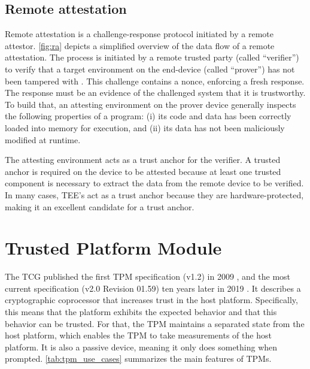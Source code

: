 \subsection{Remote attestation}



Remote attestation is a challenge-response protocol initiated by a remote attestor. \autoref{fig:ra} depicts a simplified overview of the data flow of a remote attestation.
The process is initiated by a remote trusted party (called ``verifier'') to verify that a target environment on the end-device (called ``prover'') has not been tampered with \cite{Menetrey2022, Coker2011}. This challenge contains a nonce, enforcing a fresh response.
The response must be an evidence of the challenged system that it is trustworthy. To build that, an attesting environment on the prover device generally inspects the following properties of a program: (i) its code and data has been correctly loaded into memory for execution, and (ii) its data has not been maliciously modified at runtime.

The attesting environment acts as a trust anchor for the verifier.
A trusted anchor is required on the device to be attested because at least one trusted component is necessary to extract the data from the remote device to be verified. In many cases, TEE's act as a trust anchor because they are hardware-protected, making it an excellent candidate for a trust anchor.

\section{Trusted Platform Module}
\label{sec:tpm}

The \ac{TCG} published the first TPM specification (v1.2) in 2009 \cite{ISO11889}, and the most current specification (v2.0 Revision 01.59) ten years later in 2019 \cite{tpm}.
It describes a cryptographic coprocessor that increases trust in the host platform. Specifically, this means that the platform exhibits the expected behavior and that this behavior can be trusted.
For that, the TPM maintains a separated state from the host platform, which enables the TPM to take measurements of the host platform.
It is also a passive device, meaning it only does something when prompted.
\autoref{tab:tpm_use_cases} summarizes the main features of TPMs.



